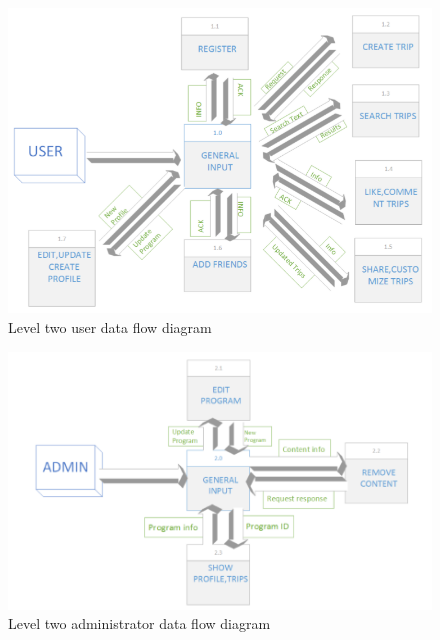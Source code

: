 \begin{figure}[!htbp]
\centering
\includegraphics[width=\textwidth]{projectChapters/images/dataflow3.png}
\caption{Level two user data flow diagram}
\label{fig:userdataflow}
\end{figure}

\begin{figure}[!htbp]
\centering
\includegraphics[width=\textwidth]{projectChapters/images/dataflow4.png}
\caption{Level two administrator data flow diagram}
\label{fig:admindataflow}
\end{figure}





